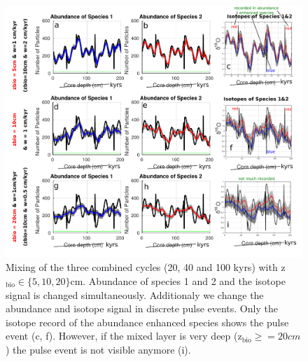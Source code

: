 \documentclass[a4paper,oneside,9pt]{article}
\begin{document}
\begin{figure}[hbp]
\begin{center}
	\includegraphics[width=1.0\textwidth]{../figures/../figures/Allcycles_combined_pointevent_5+10+20cm_background.pdf}
	\caption{Mixing of the three combined cycles (20, 40 and 100 kyrs) with z$_\mathrm{bio} \in \{5,10,20 \}$cm. Abundance of species 1 and 2 and the isotope signal is changed simultaneously. Additionaly we change the abundance and isotope signal 
	in discrete pulse events. Only the isotope record of the abundance enhanced species shows the pulse event (c, f). However, if the mixed layer is very deep (z$_\mathrm{bio}\geq=20cm$) the pulse event is not visible anymore (i).}\label{fig:allcycles+pointevent}
\end{center}
\end{figure}
\begin{figure}[hbtp]
\hspace*{-0.8cm}%
\end{figure}
\end{document}
